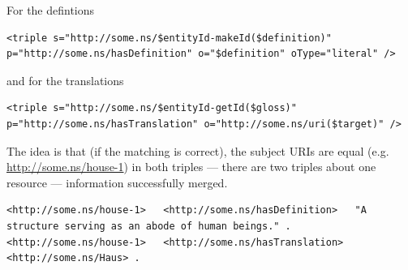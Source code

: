 For the defintions
\begin{lstlisting}[style=XML]
<triple s="http://some.ns/$entityId-makeId($definition)" p="http://some.ns/hasDefinition" o="$definition" oType="literal" />
\end{lstlisting}
and for the translations
\begin{lstlisting}[style=XML]
<triple s="http://some.ns/$entityId-getId($gloss)" p="http://some.ns/hasTranslation" o="http://some.ns/uri($target)" />
\end{lstlisting}
The idea is that (if the matching is correct), the subject URIs are equal (e.g. \url{http://some.ns/house-1}) in both triples --- there are two triples about one resource --- information successfully merged.
\begin{lstlisting}[style=N3]
<http://some.ns/house-1>   <http://some.ns/hasDefinition>   "A structure serving as an abode of human beings." .
<http://some.ns/house-1>   <http://some.ns/hasTranslation>   <http://some.ns/Haus> .
\end{lstlisting}
 
